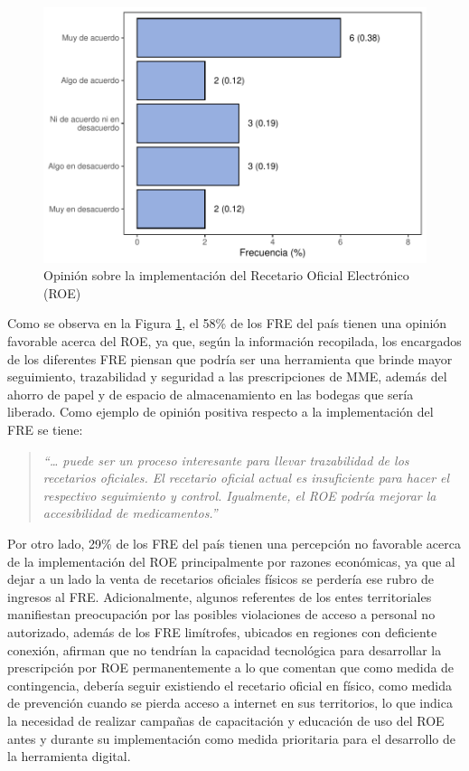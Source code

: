 \documentclass[
]{book}
\begin{document}
\begin{figure}[t]

{\centering \includegraphics[width=0.85\linewidth]{InformeFinal_files/figure-latex/FREImplementacionROE-1} 

}

\caption{Opinión sobre la implementación del Recetario Oficial Electrónico (ROE)}\label{fig:FREImplementacionROE}
\end{figure}

Como se observa en la Figura \ref{fig:FREImplementacionROE}, el 58\% de los FRE del país tienen una opinión favorable acerca del ROE, ya que, según la información recopilada, los encargados de los diferentes FRE piensan que podría ser una herramienta que brinde mayor seguimiento, trazabilidad y seguridad a las prescripciones de MME, además del ahorro de papel y de espacio de almacenamiento en las bodegas que sería liberado. Como ejemplo de opinión positiva respecto a la implementación del FRE se tiene:

\begin{quote}
\emph{``\ldots{} puede ser un proceso interesante para llevar trazabilidad de los recetarios oficiales. El recetario oficial actual es insuficiente para hacer el respectivo seguimiento y control. Igualmente, el ROE podría mejorar la accesibilidad de medicamentos.''}
\end{quote}

Por otro lado, 29\% de los FRE del país tienen una percepción no favorable acerca de la implementación del ROE principalmente por razones económicas, ya que al dejar a un lado la venta de recetarios oficiales físicos se perdería ese rubro de ingresos al FRE. Adicionalmente, algunos referentes de los entes territoriales manifiestan preocupación por las posibles violaciones de acceso a personal no autorizado, además de los FRE limítrofes, ubicados en regiones con deficiente conexión, afirman que no tendrían la capacidad tecnológica para desarrollar la prescripción por ROE permanentemente a lo que comentan que como medida de contingencia, debería seguir existiendo el recetario oficial en físico, como medida de prevención cuando se pierda acceso a internet en sus territorios, lo que indica la necesidad de realizar campañas de capacitación y educación de uso del ROE antes y durante su implementación como medida prioritaria para el desarrollo de la herramienta digital.
\end{document}
